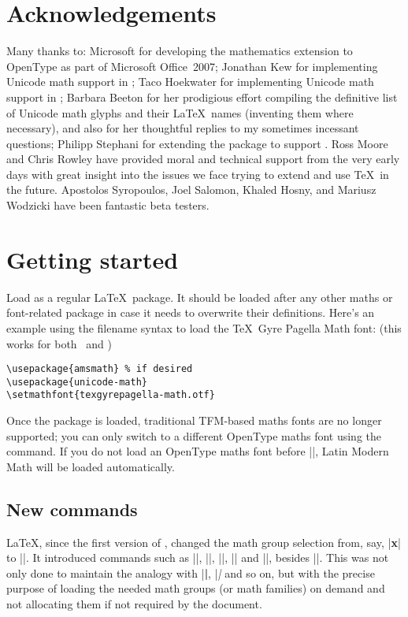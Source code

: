 \section{Acknowledgements}

Many thanks to:
Microsoft for developing the mathematics extension to OpenType as part of
Microsoft Office~2007;
Jonathan Kew for implementing Unicode math support in \XeTeX;
Taco Hoekwater for implementing Unicode math support in \LuaTeX;
Barbara Beeton for her prodigious effort compiling the definitive list of Unicode math
glyphs and their \LaTeX\ names (inventing them where necessary), and also
for her thoughtful replies to my sometimes incessant questions;
Philipp Stephani for extending the package to support \LuaTeX.
Ross Moore and Chris Rowley have provided moral and technical support
from the very early days with great insight into the issues we face trying
to extend and use \TeX\ in the future.
Apostolos Syropoulos, Joel Salomon, Khaled Hosny, and Mariusz Wodzicki
have been fantastic beta testers.

\section{Getting started}

Load  as a regular \LaTeX\ package. It should be loaded
after any other maths or font-related package in case it needs to overwrite
their definitions. Here's an example using the filename syntax to load the \TeX\ Gyre Pagella Math font: (this works for both \XeLaTeX\ and \LuaLaTeX)
\begin{Verbatim}
\usepackage{amsmath} % if desired
\usepackage{unicode-math}
\setmathfont{texgyrepagella-math.otf}
\end{Verbatim}

Once the package is loaded, traditional TFM-based maths fonts are no longer supported;
you can only switch to a different OpenType maths font using the  command.
If you do not load an OpenType maths font before ||, Latin Modern Math will be loaded automatically.

\subsection{New commands}
\LaTeX, since the first version of \LaTeXe, changed the math group
selection from, say, |{\bf x}| to ||. It introduced commands
such as |\mathbf|, |\mathit|, |\mathsf|, |\mathtt| and |\mathcal|,
besides |\mathnormal|.  This was not only done to maintain the analogy
with |\textbf|, |\textit| and so on, but with the precise purpose of
loading the needed math groups (or math families) on demand and not
allocating them if not required by the document.

